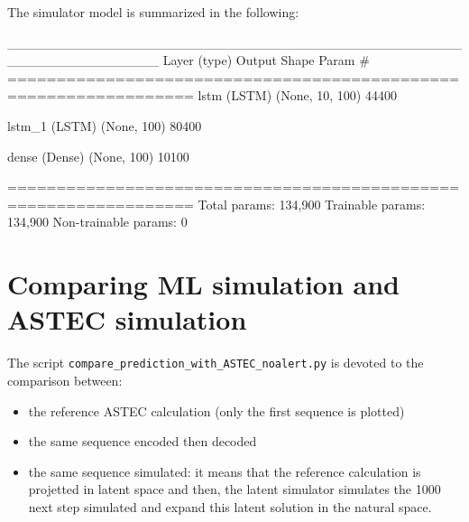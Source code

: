 The simulator model is summarized in the following:
\begin{asexample}
________________________________________________________________
 Layer (type)                Output Shape              Param #   
=================================================================
 lstm (LSTM)                 (None, 10, 100)           44400     
                                                                 
 lstm_1 (LSTM)               (None, 100)               80400     
                                                                 
 dense (Dense)               (None, 100)               10100     
                                                                 
=================================================================
Total params: 134,900
Trainable params: 134,900
Non-trainable params: 0
\end{asexample}

\section{Comparing ML simulation and ASTEC simulation}

The script \verb+compare_prediction_with_ASTEC_noalert.py+ is devoted to the comparison between:
\begin{itemize}
\item the reference ASTEC calculation (only the first sequence is plotted)
\item the same sequence encoded then decoded
\item the same sequence simulated: it means that the reference calculation is projetted in latent space and then, the latent simulator simulates the 1000 next step simulated
and expand this latent solution in the natural space.
\end{itemize}

